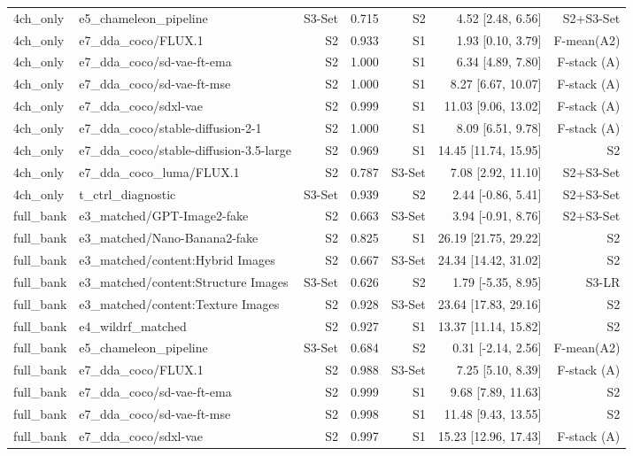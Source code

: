 \begin{table}[htbp]
\begin{tabular}{llrrrrr}
4ch\_only & e5\_chameleon\_pipeline & S3-Set & 0.715 & S2 & 4.52 [2.48, 6.56] & S2+S3-Set \\
4ch\_only & e7\_dda\_coco/FLUX.1 & S2 & 0.933 & S1 & 1.93 [0.10, 3.79] & F-mean(A2) \\
4ch\_only & e7\_dda\_coco/sd-vae-ft-ema & S2 & 1.000 & S1 & 6.34 [4.89, 7.80] & F-stack (A) \\
4ch\_only & e7\_dda\_coco/sd-vae-ft-mse & S2 & 1.000 & S1 & 8.27 [6.67, 10.07] & F-stack (A) \\
4ch\_only & e7\_dda\_coco/sdxl-vae & S2 & 0.999 & S1 & 11.03 [9.06, 13.02] & F-stack (A) \\
4ch\_only & e7\_dda\_coco/stable-diffusion-2-1 & S2 & 1.000 & S1 & 8.09 [6.51, 9.78] & F-stack (A) \\
4ch\_only & e7\_dda\_coco/stable-diffusion-3.5-large & S2 & 0.969 & S1 & 14.45 [11.74, 15.95] & S2 \\
4ch\_only & e7\_dda\_coco\_luma/FLUX.1 & S2 & 0.787 & S3-Set & 7.08 [2.92, 11.10] & S2+S3-Set \\
4ch\_only & t\_ctrl\_diagnostic & S3-Set & 0.939 & S2 & 2.44 [-0.86, 5.41] & S2+S3-Set \\
full\_bank & e3\_matched/GPT-Image2-fake & S2 & 0.663 & S3-Set & 3.94 [-0.91, 8.76] & S2+S3-Set \\
full\_bank & e3\_matched/Nano-Banana2-fake & S2 & 0.825 & S1 & 26.19 [21.75, 29.22] & S2 \\
full\_bank & e3\_matched/content:Hybrid Images & S2 & 0.667 & S3-Set & 24.34 [14.42, 31.02] & S2 \\
full\_bank & e3\_matched/content:Structure Images & S3-Set & 0.626 & S2 & 1.79 [-5.35, 8.95] & S3-LR \\
full\_bank & e3\_matched/content:Texture Images & S2 & 0.928 & S3-Set & 23.64 [17.83, 29.16] & S2 \\
full\_bank & e4\_wildrf\_matched & S2 & 0.927 & S1 & 13.37 [11.14, 15.82] & S2 \\
full\_bank & e5\_chameleon\_pipeline & S3-Set & 0.684 & S2 & 0.31 [-2.14, 2.56] & F-mean(A2) \\
full\_bank & e7\_dda\_coco/FLUX.1 & S2 & 0.988 & S3-Set & 7.25 [5.10, 8.39] & F-stack (A) \\
full\_bank & e7\_dda\_coco/sd-vae-ft-ema & S2 & 0.999 & S1 & 9.68 [7.89, 11.63] & S2 \\
full\_bank & e7\_dda\_coco/sd-vae-ft-mse & S2 & 0.998 & S1 & 11.48 [9.43, 13.55] & S2 \\
full\_bank & e7\_dda\_coco/sdxl-vae & S2 & 0.997 & S1 & 15.23 [12.96, 17.43] & F-stack (A) \\

\end{tabular}
\end{table}
